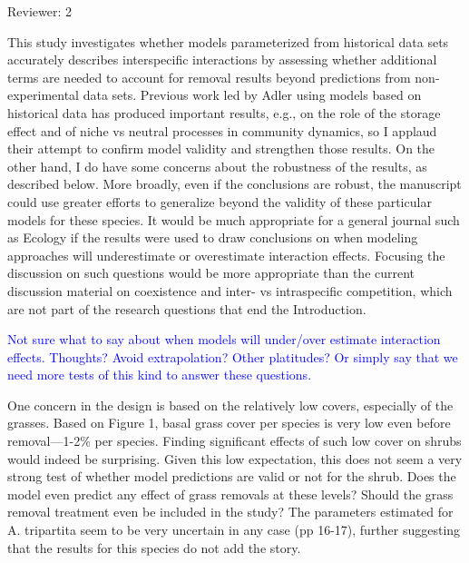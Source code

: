 \documentclass[12pt]{article}
\newcommand{\response}{\textcolor{blue}}
\begin{document}
Reviewer: 2

This study investigates whether models parameterized from historical data sets accurately describes
interspecific interactions by assessing whether additional terms are needed to account for removal
results beyond predictions from non-experimental data sets. Previous work led by Adler using models
based on historical data has produced important results, e.g., on the role of the storage effect and of
niche vs neutral processes in community dynamics, so I applaud their attempt to confirm model validity
and strengthen those results. On the other hand, I do have some concerns about the robustness of the
results, as described below. More broadly, even if the conclusions are robust, the manuscript could use
greater efforts to generalize beyond the validity of these particular models for these species. It would
be much appropriate for a general journal such as Ecology if the results were used to draw conclusions
on when modeling approaches will underestimate or overestimate interaction effects. Focusing the
discussion on such questions would be more appropriate than the current discussion material on
coexistence and inter- vs intraspecific competition, which are not part of the research questions that
end the Introduction.

\response{Not sure what to say about when models will under/over estimate interaction effects. Thoughts? Avoid extrapolation? Other platitudes?
Or simply say that we need more tests of this kind to answer these questions. }

One concern in the design is based on the relatively low covers, especially of the grasses. Based on
Figure 1, basal grass cover per species is very low even before removal—1-2\% per species. Finding
significant effects of such low cover on shrubs would indeed be surprising. Given this low expectation,
this does not seem a very strong test of whether model predictions are valid or not for the shrub. Does
the model even predict any effect of grass removals at these levels? Should the grass removal
treatment even be included in the study? The parameters estimated for A. tripartita seem to be very
uncertain in any case (pp 16-17), further suggesting that the results for this species do not add the story.
\end{document}
